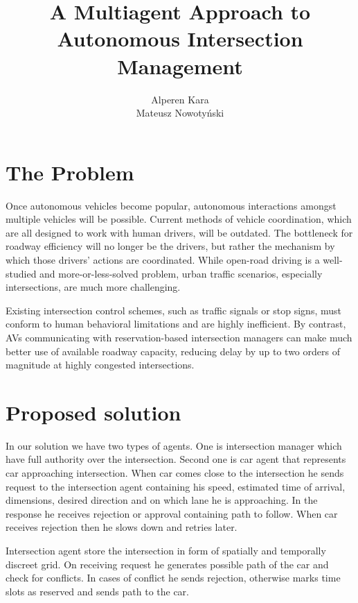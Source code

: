 \documentclass[12pt]{extreport}
\title{A Multiagent Approach to Autonomous Intersection Management}
\author{Alperen Kara\\Mateusz Nowotyński}
\begin{document}
\maketitle

\chapter{The Problem}
Once autonomous vehicles become popular, autonomous interactions amongst multiple vehicles will be possible. Current methods of vehicle coordination, which are all designed to work with human drivers, will be outdated. The bottleneck for roadway efficiency will no longer be the drivers, but rather the mechanism by which those drivers’ actions are coordinated. While open-road driving is a well-studied and more-or-less-solved problem, urban traffic scenarios, especially intersections, are much more challenging.

Existing intersection control schemes, such as traffic signals or stop signs, must conform to human behavioral limitations and are highly inefficient. By contrast, AVs communicating with reservation-based intersection managers can make much better use of available roadway capacity, reducing delay by up to two orders of magnitude at highly congested intersections.

\chapter{Proposed solution}
In our solution we have two types of agents. One is intersection manager which have full authority over the intersection. Second one is car agent that represents car approaching intersection. When car comes close to the intersection he sends request to the intersection agent containing his speed, estimated time of arrival, dimensions, desired direction and on which lane he is approaching. In the response he receives rejection or approval containing path to follow. When car receives rejection then he slows down and retries later.

Intersection agent store the intersection in form of spatially and temporally discreet grid. On receiving request he generates possible path of the car and check for conflicts. In cases of conflict he sends rejection, otherwise marks time slots as reserved and sends path to the car.
\end{document}
